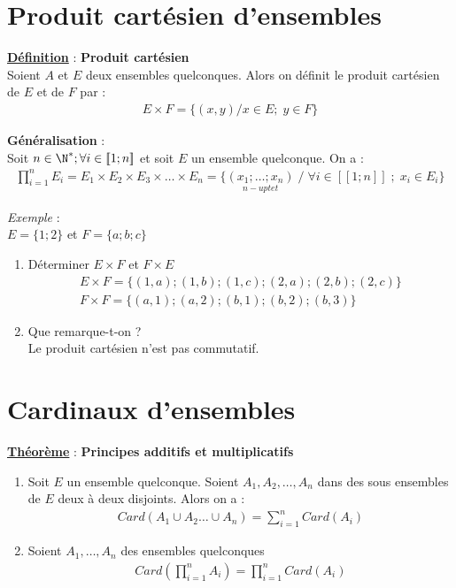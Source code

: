 \documentclass{report}
\begin{document}
\section{Produit cartésien d'ensembles}
\textbf{\underline{Définition}} : \quad \textbf{Produit cartésien} \\
Soient $A$ et $E$ deux ensembles quelconques. Alors on définit le produit cartésien de $E$ et de $F$ par : 
\begin{gather}
    E \times F = \{(x,y) / x \in E ; \; y \in F \}
\end{gather}

\textbf{Généralisation} : \\
Soit $n \in \N^* ; \forall i \in [\![1;n]\!]$ et soit $E $ un ensemble quelconque. On a : 
\begin{gather}
    \prod_{i=1}^{n} E_i = E_1 \times E_2 \times E_3 \times \dots \times E_n = \{ \underset{n-uptet}{(x_1; \dots ;x_n)} \; / \; \forall i \in [\![ 1; n ]\!] \; ; \; x_i \in E_i \}
\end{gather}

\textit{Exemple} : \\
$E=\{1;2\}$ et $F=\{a;b;c\}$ 
\begin{enumerate}
    \item Déterminer $E \times F$ et $F \times E$ 
        \begin{gather}
            E \times F = \{(1,a);(1,b);(1,c);(2,a);(2,b);(2,c)\} \\ 
            F \times F = \{(a,1);(a,2);(b,1);(b,2);(b,3) \}
        \end{gather}
    \item Que remarque-t-on ? \\
        Le produit cartésien n’est pas commutatif. 
\end{enumerate}


\section{Cardinaux d'ensembles}

\textbf{\underline{Théorème}} : \quad \textbf{Principes additifs et multiplicatifs} 
\begin{enumerate}
    \item Soit $E$ un ensemble quelconque. Soient $A_1,     A_2, \dots, A_n$ dans des sous ensembles de $E$     deux à deux disjoints. Alors on a : 
        \begin{gather}
            Card(A_1 \cup A_2 \dots \cup A_n) = \sum_{i=1}^{n} Card(A_i)
        \end{gather}
    \item Soient $A_1, \dots, A_n $ des ensembles           quelconques
        \begin{gather}
            Card ( \prod_{i=1}^{n} A_i) = \prod_{i=1}^{n} Card (A_i)
        \end{gather}
\end{enumerate} 
\end{document}
